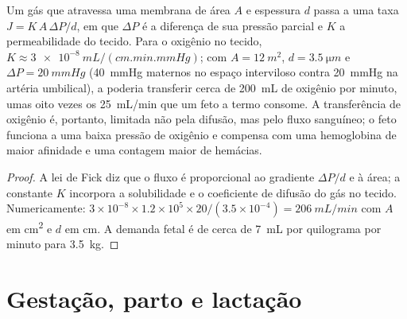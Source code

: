 \begin{theorem}\label{thm:b2:mammal-reproduction:fick}
Um gás que atravessa uma membrana de área $A$ e espessura $d$ passa a
uma taxa $J = K\,A\,\Delta P/d$, em que $\Delta P$ é a diferença de sua
pressão parcial e $K$ a permeabilidade do tecido. Para o oxigênio no
tecido, $K \approx \qty{3e-8}{mL/(cm.min.mmHg)}$; com $A =
\qty{12}{m^2}$, $d = \qty{3.5}{\micro m}$ e $\Delta P =
\qty{20}{mmHg}$ (\qty{40}{mmHg} maternos no espaço interviloso contra
\qty{20}{mmHg} na artéria umbilical), a  poderia transferir
cerca de \qty{200}{mL} de oxigênio por minuto, umas oito vezes os
\qty{25}{mL/min} que um feto a termo consome. A transferência de
oxigênio é, portanto, limitada não pela difusão, mas pelo fluxo
sanguíneo; o feto funciona a uma baixa pressão de oxigênio e compensa
com uma hemoglobina de maior afinidade e uma contagem maior de
hemácias.
\end{theorem}
\begin{proof}
A lei de Fick diz que o fluxo é proporcional ao gradiente
$\Delta P/d$ e à área; a constante $K$ incorpora a solubilidade e o
coeficiente de difusão do gás no tecido. Numericamente:
$3\times 10^{-8}\times 1.2\times 10^{5}\times 20/(3.5\times 10^{-4})
= \qty{206}{mL/min}$ com $A$ em \unit{cm^2} e $d$ em \unit{cm}. A
demanda fetal é de cerca de \qty{7}{mL} por quilograma por minuto para
\qty{3.5}{kg}.
\end{proof}

\section{Gestação, parto e lactação}

